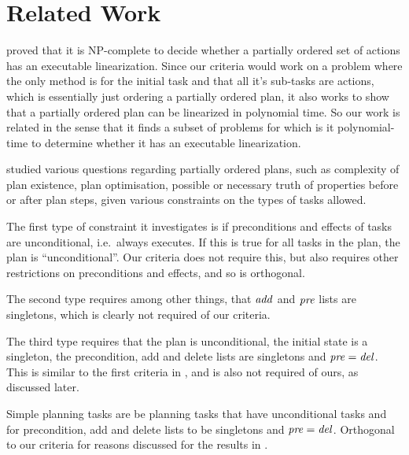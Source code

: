\chapter{Related Work}\label{chap:relatedWork}


\cite{ErolHTNExpressivity} proved that it is NP-complete to decide whether a partially ordered set of actions has an executable linearization. 
Since our criteria would work on a problem where the only method is for the initial task and that all it's sub-tasks are actions, which is essentially just ordering a partially ordered plan, it also works to show that a partially ordered plan can be linearized in polynomial time. So our work is related in the sense that it finds a subset of problems for which is it polynomial-time to determine whether it has an executable linearization.

\cite{NEBEL1994125} studied various questions regarding partially ordered plans, such as complexity of plan existence, plan optimisation, possible or necessary truth of properties before or after plan steps, given various constraints on the types of tasks allowed. 

The first type of constraint it investigates is if preconditions and effects of tasks are unconditional, i.e.\ always executes. If this is true for all tasks in the plan, the plan is \enquote{unconditional}. Our criteria does not require this, but also requires other restrictions on preconditions and effects, and so is orthogonal.

The second type requires among other things, that $\mathit{add}$ and $\mathit{pre}$ lists are singletons, which is clearly not required of our criteria. 

The third type requires that the plan is unconditional, the initial state is a singleton, the precondition, add and delete lists are singletons and $\mathit{pre} = \mathit{del}$. This is similar to the first criteria in \cite{TanGruningerPOPlanComplexity}, and is also not required of ours, as discussed later. %

Simple planning tasks are be planning tasks that have unconditional tasks and for precondition, add and delete lists to be singletons and $\mathit{pre} = \mathit{del}$. Orthogonal to our criteria for reasons discussed for the results in \cite{TanGruningerPOPlanComplexity}.


